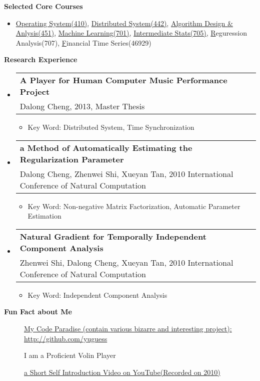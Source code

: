 \documentclass[letterpaper,11pt]{article}
\makeatletter
\newcommand{\resitem}[1]{\item #1 \vspace{-2pt}}
\newcommand{\resheading}[1]{{\large \colorbox{mygrey}{\begin{minipage}{\textwidth}{\textbf{#1 \vphantom{p\^{E}}}}\end{minipage}}}}
\newcommand{\ressubheading}[4]{
\begin{tabular*}{6.5in}{l@{\extracolsep{\fill}}r}
		\textbf{#1} & #2 \\
		{#3}{} & \textit{#4} \\
\end{tabular*}\vspace{-6pt}}
\makeatother
\begin{document}
\resheading{{Selected Core Courses}}
  \begin{itemize}
		\item{\small \href{http://www.cs.cmu.edu/~410/}{Operating System(410)}, 
    \href{http://www.cs.cmu.edu/~dga/15-440/F12/}{Distributed System(442)}, 
    \href{http://www.cs.cmu.edu/~./15451/}{Algorithm Design \& Anlysis(451)}, 
    \href{http://www.cs.cmu.edu/~epxing/Class/10701/}{Machine Learning(701)}, 
    \href{http://www.stat.cmu.edu/~larry/=stat705/}{Intermediate Stats(705)},
    \href{}Reguression Analysis(707),
    \href{}Financial Time Series(46929)}
	\end{itemize}
\resheading{Research Experience}
  \begin{itemize}

  \item 
		\ressubheading{A Player for Human Computer Music 
    Performance Project}{}{Dalong Cheng, 2013, Master Thesis}{}
    { \footnotesize
      \begin{itemize}
        \resitem{Key Word: Distributed System, Time Synchronization}
      \end{itemize}
    }
	
	\item
		\ressubheading{a Method of Automatically Estimating the 
    Regularization Parameter}{}
    {Dalong Cheng, Zhenwei Shi, Xueyan Tan, 
    2010 International Conference of Natural Computation}{}
    { \footnotesize
      \begin{itemize}
      \resitem{Key Word: Non-negative Matrix Factorization, 
      Automatic Parameter Estimation}
      \end{itemize}
    }

		\item 
			\ressubheading{Natural Gradient for Temporally Independent Component Analysis}{}{Zhenwei Shi, Dalong Cheng, Xueyan Tan, 2010 International Conference of Natural Computation}{}
			{ \footnotesize
				\begin{itemize}
					\resitem{Key Word: Independent Component Analysis}
				\end{itemize}
			}

	\end{itemize}  %

\resheading{{Fun Fact about Me}}
	\begin{description}
    \item[] {\href{http://github.com/yuguess}
    {My Code Paradise 
    (contain various bizarre and interesting project):
    http://github.com/yuguess}}

    \item[] {I am a Proficient Volin Player}

    \item[] {\href{http://www.youtube.com/watch?v=zGBpT7A_nYM}{a Short Self Introduction Video on YouTube(Recorded on 2010)}}
  \end{description}
\end{document}
